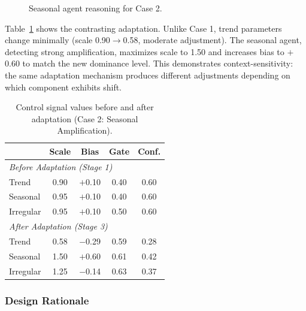\begin{figure}[h!]
\centering
{}
\caption{Seasonal agent reasoning for Case 2.}
\label{fig:case2_seasonal}
\end{figure}

Table~\ref{tab:case2_policy} shows the contrasting adaptation. Unlike Case 1, trend parameters change minimally (scale 0.90$\rightarrow$0.58, moderate adjustment). The seasonal agent, detecting strong amplification, maximizes scale to 1.50 and increases bias to $+$0.60 to match the new dominance level. This demonstrates context-sensitivity: the same adaptation mechanism produces different adjustments depending on which component exhibits shift.

\begin{table}[h!]
\centering
\small

\begin{tabular}{lcccc}
\toprule
& Scale & Bias & Gate & Conf. \\
\midrule
\multicolumn{5}{l}{\textit{Before Adaptation (Stage 1)}} \\
Trend & 0.90 & $+$0.10 & 0.40 & 0.60 \\
Seasonal & 0.95 & $+$0.10 & 0.40 & 0.60 \\
Irregular & 0.95 & $+$0.10 & 0.50 & 0.60 \\
\midrule
\multicolumn{5}{l}{\textit{After Adaptation (Stage 3)}} \\
Trend & 0.58 & $-$0.29 & 0.59 & 0.28 \\
Seasonal & 1.50 & $+$0.60 & 0.61 & 0.42 \\
Irregular & 1.25 & $-$0.14 & 0.63 & 0.37 \\
\bottomrule
\end{tabular}
\caption{Control signal values before and after adaptation (Case 2: Seasonal Amplification).}
\label{tab:case2_policy}
\end{table}


\subsubsection{Design Rationale}

